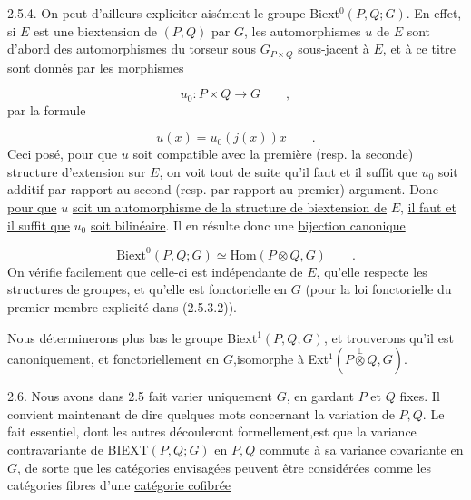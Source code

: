 
2.5.4. On peut d'ailleurs expliciter aisément le groupe Biext$^{0}(P,Q;G)$. En effet, si $E$ est une biextension de $(P,Q)$ par $G$, les automorphismes $u$ de $E$ sont d'abord des automorphismes du torseur sous $G_{P\times Q}$ sous-jacent à $E$, et à ce titre sont donnés par les morphismes

\begin{equation*}
u_{0} : P\times Q \longrightarrow G \qquad ,
\end{equation*}
par la formule

\begin{equation*}
u(x) = u_{0}(j(x))x \qquad .
\end{equation*}
Ceci posé, pour que $u$ soit compatible avec la première (resp. la seconde) structure d'extension sur $E$, on voit tout de suite qu'il faut et il suffit que $u_{0}$ soit additif par rapport au second (resp. par rapport au premier) argument. Donc \underline{pour que} $u$ \underline{soit un automorphisme de la structure de biextension de} $E$, \underline{il faut et il suffit que} $u_{0}$ \underline{soit bilinéaire}. Il en résulte donc une \underline{bijection canonique}

\begin{equation}\tag{2.5.4.1}
\mathrm{Biext}^{0}(P,Q;G) \simeq \mathrm{Hom}(P\otimes Q,G) \qquad .
\end{equation}
On vérifie facilement que celle-ci est indépendante de $E$, qu'elle respecte les structures de groupes, et qu'elle est fonctorielle en $G$ (pour la loi fonctorielle du premier membre explicité dans (2.5.3.2)).

Nous déterminerons plus bas le groupe Biext$^{1}(P,Q;G)$, et trouverons qu'il est canoniquement, et fonctoriellement en $G$,isomorphe à Ext$^{1}(P \overset{\mathbb{L}}{\otimes} Q, G)$.

2.6. Nous avons dans 2.5 fait varier uniquement $G$, en gardant $P$ et $Q$ fixes. Il convient maintenant de dire quelques mots concernant la variation de $P,Q$. Le fait essentiel, dont les autres découleront formellement,est que la variance contravariante de BIEXT$(P,Q;G)$ en $P,Q$ \underline{commute} à sa variance covariante en $G$, de sorte que les catégories envisagées peuvent être considérées
comme les catégories fibres d'une \underline{catégorie cofibrée}

